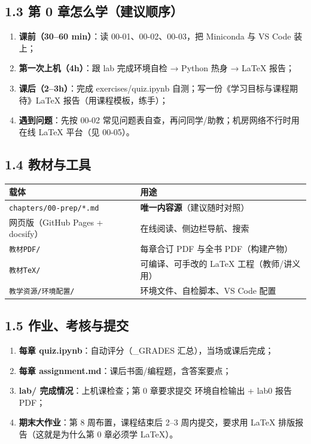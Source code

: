 \subsection{1.3 第 0
章怎么学（建议顺序）}\label{ux7b2c-0-ux7ae0ux600eux4e48ux5b66ux5efaux8baeux987aux5e8f}

\begin{enumerate}
\def\labelenumi{\arabic{enumi}.}
\tightlist
\item
  \textbf{课前（30--60 min）}：读 00-01、00-02、00-03，把 Miniconda 与
  VS Code 装上；
\item
  \textbf{第一次上机（4h）}：跟 lab 完成环境自检 → Python 热身 → LaTeX
  报告；
\item
  \textbf{课后（2--3h）}：完成 exercises/quiz.ipynb
  自测；写一份《学习目标与课程期待》LaTeX 报告（用课程模板，练手）；
\item
  \textbf{遇到问题}：先按 00-02
  常见问题表自查，再问同学/助教；机房网络不行时用在线 LaTeX 平台（见
  00-05）。
\end{enumerate}

\subsection{1.4 教材与工具}\label{ux6559ux6750ux4e0eux5de5ux5177}

{\def\LTcaptype{none} %
\begin{longtable}[]{@{}ll@{}}
\toprule\noalign{}
载体 & 用途 \\
\midrule\noalign{}
\endhead
\bottomrule\noalign{}
\endlastfoot
\texttt{chapters/00-prep/*.md} & \textbf{唯一内容源}（建议随时对照） \\
网页版（GitHub Pages + docsify） & 在线阅读、侧边栏导航、搜索 \\
\texttt{教材PDF/} & 每章合订 PDF 与全书 PDF（构建产物） \\
\texttt{教材TeX/} & 可编译、可手改的 LaTeX 工程（教师/讲义用） \\
\texttt{教学资源/环境配置/} & 环境文件、自检脚本、VS Code 配置 \\
\end{longtable}
}

\subsection{1.5
作业、考核与提交}\label{ux4f5cux4e1aux8003ux6838ux4e0eux63d0ux4ea4}

\begin{enumerate}
\def\labelenumi{\arabic{enumi}.}
\tightlist
\item
  \textbf{每章 quiz.ipynb}：自动评分（\_GRADES 汇总），当场或课后完成；
\item
  \textbf{每章 assignment.md}：课后书面/编程题，含答案要点；
\item
  \textbf{lab/ 完成情况}：上机课检查；第 0 章要求提交 环境自检输出 +
  lab0 报告 PDF；
\item
  \textbf{期末大作业}：第 8 周布置，课程结束后 2--3 周内提交，要求用
  LaTeX 排版报告（这就是为什么第 0 章必须学 LaTeX）。
\end{enumerate}

